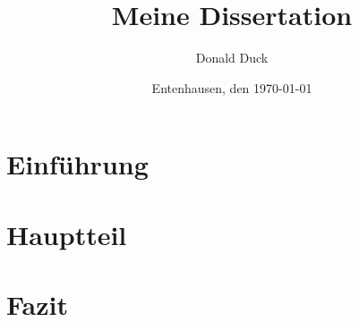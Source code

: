 \documentclass[12pt,ngerman]{scrreprt}
\author{Donald Duck}
\title{Meine Dissertation}
\date{Entenhausen, den \today}
\begin{document}
\maketitle

\tableofcontents

\section{Einführung}

\blindtext[10]

\section{Hauptteil}

\blindtext[10]

\section{Fazit}

\blindtext[10]
\end{document}

